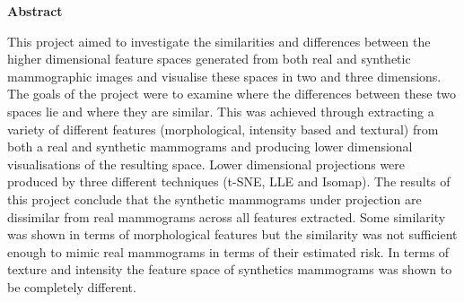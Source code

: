 \thispagestyle{empty}

\begin{center}
    {\LARGE\bf Abstract}
\end{center}

This project aimed to investigate the similarities and differences between the higher dimensional feature spaces generated from both real and synthetic mammographic images and visualise these spaces in two and three dimensions. The goals of the project were to examine where the differences between these two spaces lie and where they are similar. This was achieved through extracting a variety of different features (morphological, intensity based and textural) from both a real and synthetic mammograms and producing lower dimensional visualisations of the resulting space. Lower dimensional projections were produced by three different techniques (t-SNE, LLE and Isomap). The results of this project conclude that the synthetic mammograms under projection are dissimilar from real mammograms across all features extracted. Some similarity was shown in terms of morphological features but the similarity was not sufficient enough to mimic real mammograms in terms of their estimated risk. In terms of texture and intensity the feature space of synthetics mammograms was shown to be completely different. 

